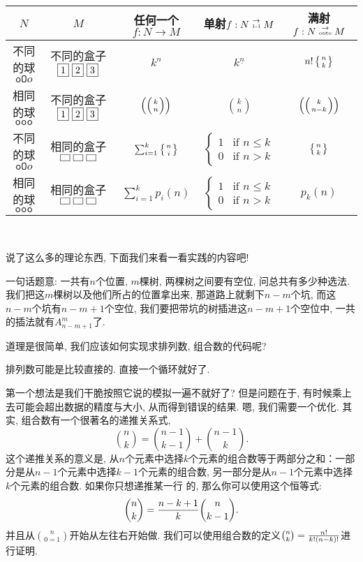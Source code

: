 {\center \begin{tabular}[pos]{|c|c|ccc|}
  \hline
  $N$ & $M$ & 任何一个$f:N\to M$ & 单射$f:N\stackrel{\to}{\text{\tiny 1-1}} M$ & 满射$f:N\stackrel{\to}{\text{\tiny onto}} M$   \\
  \hline
  不同的球$\texttt{oO}o$ & 不同的盒子$\fbox{1}~\fbox{2}~\fbox{3}$ & $k^n$ & $k^{\underline n}$ & $n!\left\{{n \atop k}\right\}$\\
  相同的球$\texttt{ooo}$ & 不同的盒子$\fbox{1}~\fbox{2}~\fbox{3}$ & $\left(\left({k \atop n}\right)\right)$ & ${k\choose n}$ & $\left(\left({k \atop n-k}\right)\right)$\\
  不同的球$\texttt{oO}o$ & 相同的盒子$\fbox{~}~\fbox{~}~\fbox{~}$ & $\sum_{i=1}^k \left\{{n \atop i}\right\}$ & $\begin{cases}1 & \text{if }n\leq k\\ 0& \text{if }n>k\end{cases}$ & $\left\{{n \atop k}\right\}$\\
  相同的球$\texttt{ooo}$ & 相同的盒子$\fbox{~}~\fbox{~}~\fbox{~}$ & $\sum_{i=1}^k p_i(n)$ & $\begin{cases}1 & \text{if }n\leq k\\ 0& \text{if }n>k\end{cases}$ & $p_k(n)$\\
  \hline
\end{tabular}\\}

说了这么多的理论东西, 下面我们来看一看实践的内容吧! 

 一句话题意: 一共有$n$个位置, $m$棵树, 两棵树之间要有空位, 
问总共有多少种选法. 
我们把这$m$棵树以及他们所占的位置拿出来, 那道路上就剩下$n-m$个坑, 
而这$n-m$个坑有$n-m+1$个空位, 
我们要把带坑的树插进这$n-m+1$个空位中, 一共的插法就有$A_{n-m+1}^m$了.

道理是很简单, 我们应该如何实现求排列数, 组合数的代码呢? 

 排列数可能是比较直接的. 直接一个循环就好了. 

 第一个想法是我们干脆按照它说的模拟一遍不就好了? 但是问题在于, 
有时候乘上去可能会超出数据的精度与大小, 从而得到错误的结果. 嗯, 我们需要一个优化. 
其实, 组合数有一个很著名的递推关系式, 
$$\binom{n}{k} = \binom{n-1}{k-1} + \binom{n-1}{k}.$$
这个递推关系的意义是, 从$n$个元素中选择$k$个元素的组合数等于两部分之和：一部分是从$n-1$个元素中选择$k-1$个元素的组合数, 另一部分是从$n-1$个元素中选择$k$个元素的组合数. 如果你只想递推某一行
的, 那么你可以使用这个恒等式: $${n\choose k}={n-k+1\over k}{n\choose k-1}.$$
并且从$n\choose 0=1$开始从左往右开始做. 我们可以使用组合数的定义${n\choose k}={n!\over 
k!(n-k)!}$进行证明. 

